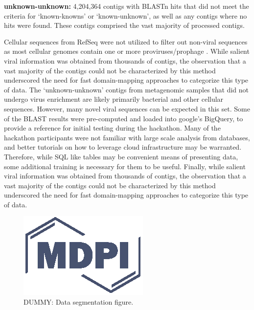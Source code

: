    \textbf{unknown-unknown:} 4,204,364 contigs with BLASTn hits that did not
    meet the criteria for ‘known-knowns’ or ‘known-unknown’, as well as any
    contigs where no hits were found. These contigs comprised the vast majority
    of processed contigs.

  Cellular sequences from RefSeq were not utilized to filter out non-viral
  sequences as most cellular genomes contain one or more proviruses/prophage
  \cite{Roux2015,Liu2011b}. While salient viral information was obtained from
  thousands of contigs, the observation that a vast majority of the contigs
  could not be characterized by this method underscored the need for fast
  domain-mapping approaches to categorize this type of data. The
  ‘unknown-unknown’ contigs from metagenomic samples that did not undergo virus
  enrichment are likely primarily bacterial and other cellular sequences.
  However, many novel viral sequences can be expected in this set. Some of the
  BLAST results were pre-computed and loaded into google's BigQuery, to provide
  a reference for initial testing during the hackathon. Many of the hackathon
  participants were not familiar with large scale analysis from databases, and
  better tutorials on how to leverage cloud infrastructure may be warranted.
  Therefore, while SQL like tables may be convenient means of presenting data,
  some additional training is necessary for them to be useful. Finally, while
  salient viral information was obtained from thousands of contigs, the
  observation that a vast majority of the contigs could not be characterized by
  this method underscored the need for fast domain-mapping approaches to
  categorize this type of data.

  \begin{figure}[h]
    \centering
    \includegraphics{Definitions/logo-mdpi}
    \caption{DUMMY: Data segmentation figure.
            \label{fig:data_segmentation}}
  \end{figure}

